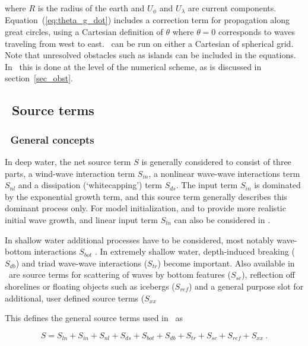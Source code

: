 \noindent
where $R$ is the radius of the earth and $U_\phi$ and $U_\lambda$ are current
components. Equation~(\ref{eq:theta_g_dot}) includes a correction term for
propagation along great circles, using a Cartesian definition of $\theta$
where $\theta = 0$ corresponds to waves traveling from west to east. \ws\ can
be run on either a Cartesian of spherical grid. Note that unresolved obstacles
such as islands can be included in the equations. In \ws\ this is done at the
level of the numerical scheme, as is discussed in section~\ref{sec_obst}.


\vssub
\subsection{~Source terms}
\vsssub
\subsubsection{~General concepts}
\vsssub

In deep water, the net source term $S$ is generally considered to consist of
three parts, a wind-wave interaction term $S_{in}$, a nonlinear wave-wave
interactions term $S_{nl}$ and a dissipation (`whitecapping') term $S_{ds}$.
The input term $S_{in}$ is dominated by the exponential growth term, and this
source term generally describes this dominant process only. For model
initialization, and to provide more realistic initial wave growth, and linear
input term $S_{ln}$ can also be considered in \ws.

In shallow water additional processes have to be considered, most notably
wave-bottom interactions $S_{bot}$ \cite[e.g.,][]{pro:Sea78}. In extremely
shallow water, depth-induced breaking ($S_{db}$) and triad wave-wave
interactions ($S_{tr}$) become important. Also available in \ws\ are source
terms for scattering of waves by bottom features ($S_{sc}$), reflection off shorelines or floating objects such as icebergs ($S_{ref}$) and a general
purpose slot for additional, user defined source terms ($S_{xx}$

This defines the general source terms used in \ws\ as


\begin{equation}
S = S_{ln} + S_{in} + S_{nl} + S_{ds} + S_{bot} + S_{db} + S_{tr} + S_{sc} + S_{ref} +
    S_{xx}\: .
\label{eq:general_st}
\end{equation}

